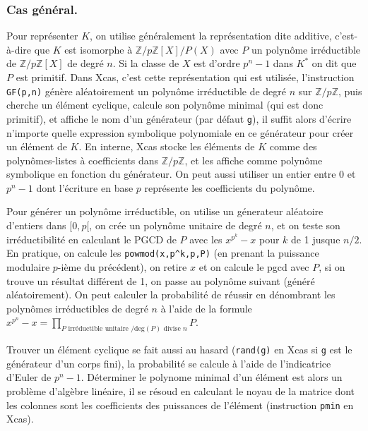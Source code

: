 \documentclass[a4paper,11pt]{article}
\newcommand{\Z}{{\mathbb{Z}}}
\begin{document}
\subsubsection{Cas g\'en\'eral.}
Pour repr\'esenter $K$, on utilise g\'en\'eralement la
repr\'esentation dite additive, c'est-\`a-dire que $K$
est isomorphe \`a $\Z/p\Z[X]/P(X)$ avec $P$ un polyn\^ome
irr\'eductible de $\Z/p\Z[X]$ de degr\'e $n$. Si la classe de $X$
est d'ordre $p^n-1$ dans $K^*$ on dit que $P$ est primitif.
Dans Xcas, c'est cette repr\'esentation qui est utilis\'ee,
l'instruction \verb|GF(p,n)| g\'en\`ere al\'eatoirement
un polyn\^ome irr\'eductible de degr\'e $n$ sur $\Z/p\Z$,
puis cherche un \'el\'ement cyclique, calcule son polyn\^ome
minimal (qui est donc primitif), et affiche le nom d'un
g\'en\'erateur (par d\'efaut \verb|g|), 
il suffit alors d'\'ecrire n'importe quelle
expression symbolique polynomiale en ce g\'en\'erateur
pour cr\'eer un \'el\'ement de $K$. En interne, Xcas stocke
les \'el\'ements de $K$ comme des polyn\^omes-listes
\`a coefficients dans $\Z/p\Z$, et les affiche comme polyn\^ome
symbolique en fonction du g\'en\'erateur. On peut aussi
utiliser un entier entre 0 et $p^n-1$ dont l'\'ecriture en base
$p$ repr\'esente les coefficients du polyn\^ome.

Pour g\'en\'erer un polyn\^ome irr\'eductible, on utilise
un g\'enerateur al\'eatoire d'entiers dans $[0,p[$,
on cr\'ee un polyn\^ome unitaire de degr\'e $n$, et
on teste son irr\'eductibilit\'e en calculant le PGCD
de $P$ avec les $x^{p^k}-x$ pour $k$ de 1 jusque $n/2$.
En pratique, on calcule les \verb|powmod(x,p^k,p,P)|
(en prenant la puissance modulaire $p$-i\`eme
du pr\'ec\'edent), on retire $x$ et on calcule le pgcd avec $P$,
si on trouve un r\'esultat diff\'erent de 1, on passe au polyn\^ome
suivant (g\'en\'er\'e al\'eatoirement).
On peut calculer la probabilit\'e de r\'eussir en d\'enombrant
les polyn\^omes irr\'eductibles de degr\'e $n$ \`a l'aide
de la formule $x^{p^n}-x=\prod_{P \mbox{ irréductible unitaire }/ \mbox{deg}(P)\mbox{ divise } n} P$.

Trouver un \'el\'ement cyclique se fait aussi au hasard
(\verb|rand(g)| en Xcas si \verb|g| est le g\'en\'erateur
d'un corps fini), la
probabilit\'e se calcule \`a l'aide de l'indicatrice d'Euler de
$p^n-1$. D\'eterminer le polynome minimal d'un \'el\'ement
est alors un probl\`eme d'alg\`ebre lin\'eaire, il se r\'esoud
en calculant le noyau de la matrice dont les colonnes sont
les coefficients des puissances de l'\'el\'ement (instruction
\verb|pmin| en Xcas).
\end{document}
